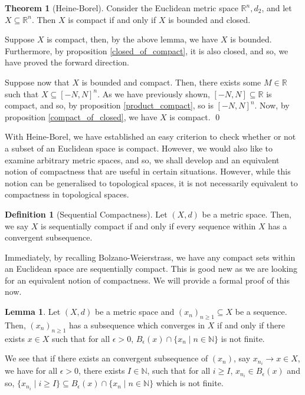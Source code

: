 \documentclass[
]{article}
\theoremstyle{definition}
\newtheorem{theorem}{Theorem}
\theoremstyle{definition}
\newtheorem{definition}{Definition}[section]
\newtheorem{lemma}{Lemma}[section]
\begin{document}
\begin{theorem}[Heine-Borel]
  Consider the Euclidean metric space \(\mathbb{R}^n, d_2\), and let 
  \(X \subseteq \mathbb{R}^n\). Then \(X\) is compact if and only if \(X\) is 
  bounded and closed.
\end{theorem}
\proof

Suppose \(X\) is compact, then, by the above lemma, we have \(X\) is
bounded. Furthermore, by proposition \ref{closed_of_compact}, it is also
closed, and so, we have proved the forward direction.

Suppose now that \(X\) is bounded and compact. Then, there exists some
\(M \in \mathbb{R}\) such that \(X \subseteq [-N, N]^n\). As we have
previously shown, \([-N, N] \subseteq \mathbb{R}\) is compact, and so,
by proposition \ref{product_compact}, so is \([-N, N]^n\). Now, by
proposition \ref{compact_of_closed}, we have \(X\) is compact. \qed

With Heine-Borel, we have established an easy criterion to check whether
or not a subset of an Euclidean space is compact. However, we would also
like to examine arbitrary metric spaces, and so, we shall develop and an
equivalent notion of compactness that are useful in certain situations.
However, while this notion can be generalised to topological spaces, it
is not necessarily equivalent to compactness in topological spaces.

\begin{definition}[Sequential Compactness]
  Let \((X, d)\) be a metric space. Then, we say \(X\) is sequentially compact 
  if and only if every sequence within \(X\) has a convergent subsequence.
\end{definition}

Immediately, by recalling Bolzano-Weierstrass, we have any compact sets
within an Euclidean space are sequentially compact. This is good new as
we are looking for an equivalent notion of compactness. We will provide
a formal proof of this now.

\begin{lemma}
  Let \((X, d)\) be a metric space and \((x_n)_{n \ge 1} \subseteq X\) be a 
  sequence. Then, \((x_n)_{n \ge 1}\) has a subsequence which converges in \(X\) 
  if and only if there exists \(x \in X\) such that for all \(\epsilon > 0\), 
  \(B_\epsilon(x) \cap \{x_n \mid n \in \mathbb{N}\}\) is not finite.
\end{lemma}
\proof

We see that if there exists an convergent subsequence of \((x_n)\), say
\(x_{n_i} \to x \in X\), we have for all \(\epsilon > 0\), there exists
\(I \in \mathbb{N}\), such that for all \(i \ge I\),
\(x_{n_i} \in B_\epsilon(x)\) and so,
\(\{x_{n_i} \mid i \ge I\} \subseteq B_\epsilon(x)  \cap \{x_n \mid n \in \mathbb{N}\}\)
which is not finite.
\end{document}
